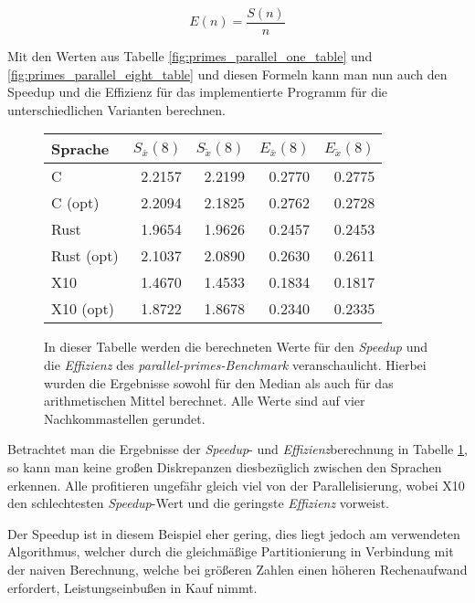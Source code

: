 \begin{equation}
	\label{formula:effizienz}
	E(n) = \frac{S(n)}{n}
\end{equation}

Mit den Werten aus Tabelle \ref{fig:primes_parallel_one_table} und \ref{fig:primes_parallel_eight_table} und diesen
Formeln kann man nun auch den Speedup und die Effizienz für das implementierte Programm für die unterschiedlichen
Varianten berechnen.

\begin{figure}[hb]
	\begin{center}
		\begin{tabular}{lrrrr}
			\toprule
			Sprache & $S_{\bar{x}}(8)$ & $S_{\tilde{x}}(8)$ & $E_{\bar{x}}(8)$ & $E_{\tilde{x}}(8)$ \\
			\midrule
			C          & 2.2157 & 2.2199 & 0.2770 & 0.2775 \\
			C (opt)    & 2.2094 & 2.1825 & 0.2762 & 0.2728 \\
			Rust       & 1.9654 & 1.9626 & 0.2457 & 0.2453 \\
			Rust (opt) & 2.1037 & 2.0890 & 0.2630 & 0.2611 \\
			X10        & 1.4670 & 1.4533 & 0.1834 & 0.1817 \\
			X10 (opt)  & 1.8722 & 1.8678 & 0.2340 & 0.2335 \\
			\bottomrule
		\end{tabular}
	\end{center}
	\caption{
		In dieser Tabelle werden die berechneten Werte für den \textit{Speedup} und die \textit{Effizienz}
		des \textit{parallel-primes-Benchmark} veranschaulicht. Hierbei wurden die Ergebnisse sowohl für den
		Median als auch für das arithmetischen Mittel berechnet. Alle Werte sind auf vier Nachkommastellen gerundet.
	}
	\label{fig:primes_parallel_speedup_efficiency_table}
\end{figure}

Betrachtet man die Ergebnisse der \textit{Speedup}- und \textit{Effizienz}berechnung in Tabelle
\ref{fig:primes_parallel_speedup_efficiency_table}, so kann man keine großen Diskrepanzen 
diesbezüglich zwischen den Sprachen erkennen. Alle profitieren ungefähr gleich viel von der Parallelisierung,
wobei X10 den schlechtesten \textit{Speedup}-Wert und die geringste \textit{Effizienz} vorweist.

Der Speedup ist in diesem Beispiel eher gering, dies liegt jedoch am verwendeten Algorithmus, welcher durch
die gleichmäßige Partitionierung in Verbindung mit der naiven Berechnung, welche bei größeren Zahlen
einen höheren Rechenaufwand erfordert, Leistungseinbußen in Kauf nimmt.


